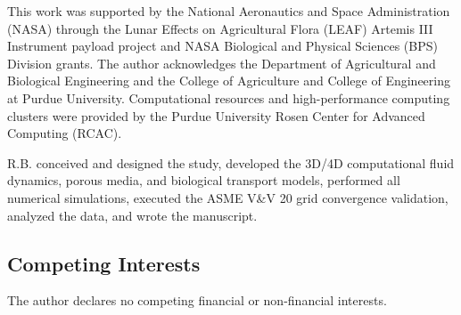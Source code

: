 \documentclass[pdflatex,sn-nature,iicol]{sn-jnl}
\begin{document}
\backmatter

This work was supported by the National Aeronautics and Space Administration (NASA) through the Lunar Effects on Agricultural Flora (LEAF) Artemis III Instrument payload project and NASA Biological and Physical Sciences (BPS) Division grants. The author acknowledges the Department of Agricultural and Biological Engineering and the College of Agriculture and College of Engineering at Purdue University. Computational resources and high-performance computing clusters were provided by the Purdue University Rosen Center for Advanced Computing (RCAC).

R.B. conceived and designed the study, developed the 3D/4D computational fluid dynamics, porous media, and biological transport models, performed all numerical simulations, executed the ASME V\&V 20 grid convergence validation, analyzed the data, and wrote the manuscript.

\subsection*{Competing Interests}
The author declares no competing financial or non-financial interests.


\end{document}
